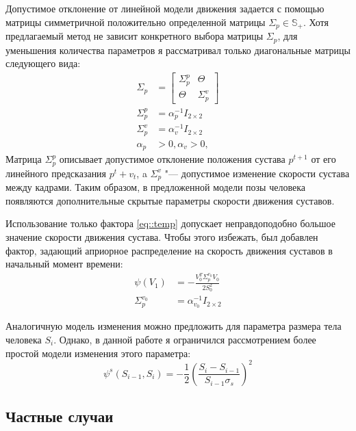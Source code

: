 Допустимое отклонение от линейной модели движения задается с помощью матрицы симметричной положительно определенной матрицы $\Sigma_p \in \mathbb{S_+}$.  Хотя предлагаемый метод не зависит конкретного выбора матрицы $\Sigma_p$, для уменьшения количества параметров я рассматривал только диагональные матрицы следующего вида:
\begin{equation}
	\begin{aligned}
		\Sigma_p &= \left[
			\begin{array}{c|c}
			\Sigma_p^p & \Theta \\ \hline
			\Theta     & \Sigma_p^v
			\end{array}
			\right] \\
		\Sigma_p^p &= \alpha_p^{-1} I_{2\times2} \\
		\Sigma_p^v &= \alpha_v^{-1} I_{2\times2} \\
		\alpha_p &> 0, \alpha_v > 0,
	\end{aligned}
\end{equation}
Матрица $\Sigma_p^p$ описывает допустимое отклонение положения сустава $p^{t+1}$ от его линейного предсказания $p^t + v_t$, a $\Sigma_p^v$ "--- допустимое изменение скорости сустава между кадрами.
Таким образом, в предложенной модели позы человека появляются дополнительные скрытые параметры скорости движения суставов.

Использование только фактора \eqref{eq::temp} допускает неправдоподобно большое значение скорости движения сустава. Чтобы этого избежать, был добавлен фактор, задающий априорное распределение на скорость движения суставов в начальный момент времени:
\begin{equation}
	\begin{aligned}
		\psi(V_1) &= -\frac{V_0^T \Sigma_p^{v_0} V_0}{2 S_0^2} \\
		\Sigma_p^{v_0} &= \alpha_{v_0}^{-1} I_{2\times2}
	\end{aligned}
\end{equation}

Аналогичную модель изменения можно предложить для параметра размера тела человека $S_i$. Однако, в данной работе я ограничился рассмотрением более простой модели изменения этого параметра:
\begin{equation}
	\psi^s(S_{i-1}, S_i) = -\frac{1}{2} \left(\frac{S_i - S_{i-1}}{S_{i-1}\sigma_s}\right)^2
\end{equation}

\subsection{Частные случаи}

